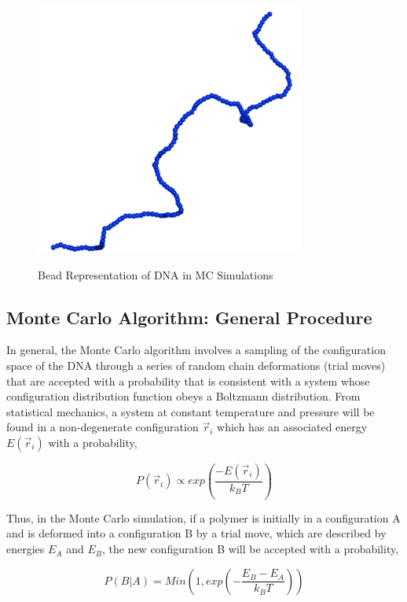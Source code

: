 \documentclass[english]{article}
\begin{document}
\begin{figure}[h]
\centering
\caption{Bead Representation of DNA in MC Simulations}

\includegraphics[scale=0.5]{figures/linear.png}
\label{figure2}
\end{figure}




\subsection{Monte Carlo Algorithm: General Procedure}

In general, the Monte Carlo algorithm involves a sampling of the configuration space of the DNA through a series of random chain deformations (trial moves) that are accepted with a probability that is consistent with a system whose configuration distribution function obeys a Boltzmann distribution. From statistical mechanics, a system at constant temperature and pressure will be found in a non-degenerate configuration ${\vec{r}_i}$ which has an associated energy $E(\vec{r}_i)$ with a probability,

\begin{equation}
P(\vec{r}_i)\propto exp(\frac{-E(\vec{r}_i)}{k_BT})
\end{equation}

Thus, in the Monte Carlo simulation, if a polymer is initially in a configuration A and is deformed into a configuration B by a trial move, which are described by energies $E_A$ and $E_B$, the new configuration B will be accepted with a probability,

\begin{equation}
P(B|A)=Min(1,exp(-\frac{E_B-E_A}{k_BT}))\label{metropolis}
\end{equation}
\end{document}
